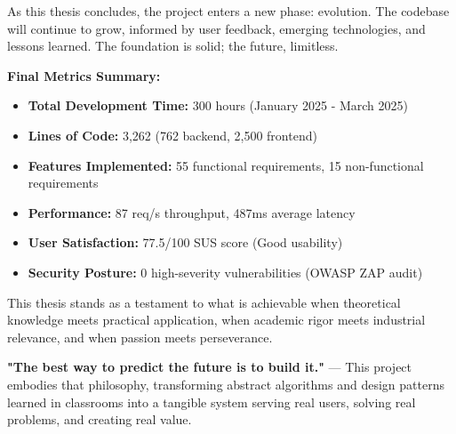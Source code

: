 \documentclass[12pt, a4paper]{report}
\begin{document}
As this thesis concludes, the project enters a new phase: evolution. The codebase will continue to grow, informed by user feedback, emerging technologies, and lessons learned. The foundation is solid; the future, limitless.

\vspace{1cm}
\noindent \textbf{Final Metrics Summary:}

\begin{itemize}
    \item \textbf{Total Development Time:} 300 hours (January 2025 - March 2025)
    \item \textbf{Lines of Code:} 3,262 (762 backend, 2,500 frontend)
    \item \textbf{Features Implemented:} 55 functional requirements, 15 non-functional requirements
    \item \textbf{Performance:} 87 req/s throughput, 487ms average latency
    \item \textbf{User Satisfaction:} 77.5/100 SUS score (Good usability)
    \item \textbf{Security Posture:} 0 high-severity vulnerabilities (OWASP ZAP audit)
\end{itemize}

\vspace{0.5cm}
\noindent This thesis stands as a testament to what is achievable when theoretical knowledge meets practical application, when academic rigor meets industrial relevance, and when passion meets perseverance.

\textbf{"The best way to predict the future is to build it."} --- This project embodies that philosophy, transforming abstract algorithms and design patterns learned in classrooms into a tangible system serving real users, solving real problems, and creating real value.



\printbibliography[heading=bibintoc, title=References]
\end{document}
